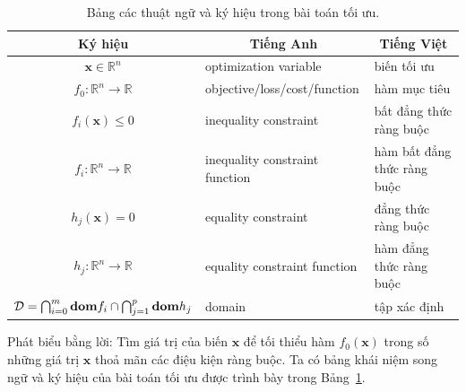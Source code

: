  \begin{table}[t]
\centering
\caption{Bảng các thuật ngữ và ký hiệu trong bài toán tối ưu.}
\label{tab:17_terms}
\setlength{\tabcolsep}{0.5em}
{\small {}
\begin{tabular}{|c|l|l|}
\hline
\multicolumn{1}{|c|}{\textbf{Ký hiệu}} & \multicolumn{1}{c|}{\textbf{Tiếng Anh}}
& \multicolumn{1}{c|}{\textbf{Tiếng Việt}} \\ \hline \hline 
 $\mathbf{x} \in \mathbb{R}^n$   & optimization variable                   & biến tối ưu                              \\ \hline
$f_0: \mathbb{R}^n \rightarrow \mathbb{R}$  & objective/loss/cost/function            & hàm mục tiêu                             \\ \hline
$f_i(\mathbf{x}) \leq 0 $  & inequality constraint                   & bất đẳng thức ràng buộc                  \\ \hline
 $f_i: \mathbb{R}^n \rightarrow \mathbb{R}$  & inequality constraint function          & hàm bất đẳng thức ràng buộc              \\ \hline
$h_j(\mathbf{x}) = 0 $   & equality constraint                     & đẳng thức ràng buộc                      \\ \hline
$h_j: \mathbb{R}^n \rightarrow \mathbb{R}$   & equality constraint function            & hàm đẳng thức ràng buộc                  \\ \hline
 $\mathcal{D} = \bigcap_{i=0}^m \text{\bf dom}f_i \cap \bigcap_{j=1}^p \text{\bf dom}h_j $  & domain                                  & tập xác định                             \\ \hline
\end{tabular}}
\end{table}

Phát biểu bằng lời: Tìm giá trị của biến $\mathbf{x}$ để tối thiểu hàm
$f_0(\mathbf{x})$ trong số những giá trị $\mathbf{x}$ thoả mãn các điệu kiện
ràng buộc. Ta có bảng khái niệm song ngữ và ký hiệu của bài toán tối ưu được trình bày  trong Bảng~\ref{tab:17_terms}. 

